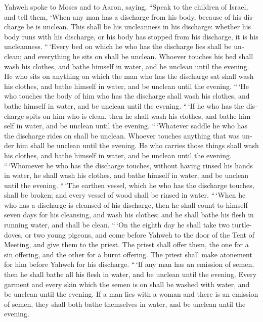 \begin{paracol}{2}
\begin{otherlanguage}{english}
 Yahweh spoke to Moses and to Aaron, saying,
 ``Speak to the children of Israel, and tell them, `When
any man has a discharge from his body, because of his discharge he is
unclean.  This shall be his uncleanness in his discharge:
whether his body runs with his discharge, or his body has stopped from
his discharge, it is his uncleanness.  ``\,`Every bed on
which he who has the discharge lies shall be unclean; and everything he
sits on shall be unclean.  Whoever touches his bed shall
wash his clothes, and bathe himself in water, and be unclean until the
evening.  He who sits on anything on which the man who has
the discharge sat shall wash his clothes, and bathe himself in water,
and be unclean until the evening.  ``\,`He who touches the
body of him who has the discharge shall wash his clothes, and bathe
himself in water, and be unclean until the evening. 
``\,`If he who has the discharge spits on him who is clean, then he
shall wash his clothes, and bathe himself in water, and be unclean until
the evening.  ``\,`Whatever saddle he who has the
discharge rides on shall be unclean.  Whoever touches
anything that was under him shall be unclean until the evening. He who
carries those things shall wash his clothes, and bathe himself in water,
and be unclean until the evening.  ``\,`Whomever he who
has the discharge touches, without having rinsed his hands in water, he
shall wash his clothes, and bathe himself in water, and be unclean until
the evening.  ``\,`The earthen vessel, which he who has
the discharge touches, shall be broken; and every vessel of wood shall
be rinsed in water.  ``\,`When he who has a discharge is
cleansed of his discharge, then he shall count to himself seven days for
his cleansing, and wash his clothes; and he shall bathe his flesh in
running water, and shall be clean.  ``\,`On the eighth
day he shall take two turtledoves, or two young pigeons, and come before
Yahweh to the door of the Tent of Meeting, and give them to the priest.
 The priest shall offer them, the one for a sin offering,
and the other for a burnt offering. The priest shall make atonement for
him before Yahweh for his discharge.  ``\,`If any man has
an emission of semen, then he shall bathe all his flesh in water, and be
unclean until the evening.  Every garment and every skin
which the semen is on shall be washed with water, and be unclean until
the evening.  If a man lies with a woman and there is an
emission of semen, they shall both bathe themselves in water, and be
unclean until the evening.


\end{otherlanguage}
\end{paracol}
